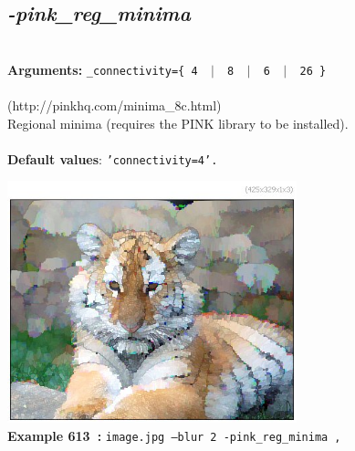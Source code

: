 \documentclass[a4paper,11pt,twoside]{book}
\begin{document}
\subsection{\emph{-pink\_reg\_minima} }\vspace*{-0.5em}
~\\\textbf{Arguments: } 
{\small \texttt{\_connectivity=\{ 4 ~$|$~ 8 ~$|$~ 6 ~$|$~ 26 \}}}\\~\\
(http://pinkhq.com/minima\_8c.html)
~\\Regional minima (requires the PINK library to be installed).
~\\~\\\textbf{Default values}: {\small \texttt{'connectivity=4'.}}
\begin{center}\includegraphics[keepaspectratio=true,height=7cm,width=\textwidth]{img/gmic_def613.jpg}\\
{\footnotesize \textbf{Example 613~:} \texttt{image.jpg --blur 2 -pink\_reg\_minima ,}}
\end{center}
\end{document}
